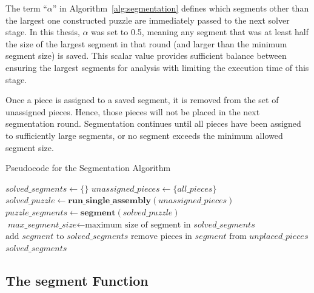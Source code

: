 The term ``\textit{$\alpha$}'' in Algorithm~\ref{alg:segmentation} defines which segments other than the largest one constructed puzzle are immediately passed to the next solver stage.  In this thesis, \textit{$\alpha$} was set to 0.5, meaning any segment that was at least half the size of the largest segment in that round (and larger than the minimum segment size) is saved.  This scalar value provides sufficient balance between ensuring the largest segments for analysis with limiting the execution time of this stage.

Once a piece is assigned to a saved segment, it is removed from the set of unassigned pieces.  Hence, those pieces will not be placed in the next segmentation round.  Segmentation continues until all pieces have been assigned to sufficiently large segments, or no segment exceeds the minimum allowed segment size.

\begin{algorithm}
\caption{Pseudocode for the Segmentation Algorithm}\label{alg:segmentation}
\begin{algorithmic}[1]
    \State $\textit{solved\_segments} \gets \{ \}$
    \State $\textit{unassigned\_pieces} \gets \{ \textit{all\_pieces} \}$
    \Repeat
        \State $\textit{solved\_puzzle} \gets \textbf{run\_single\_assembly}(\textit{unassigned\_pieces})$
        \State $\textit{puzzle\_segments} \gets \textbf{segment}(\textit{solved\_puzzle})$
        \State $\textit{max\_segment\_size} \gets \text{maximum size of segment in } \textit{solved\_segments}$
                \State $\text{add } \textit{segment} \text{ to } \textit{solved\_segments}$
                \State $\text{remove pieces in } \textit{segment} \text{ from } \textit{unplaced\_pieces}$
            \EndIf
        \EndFor
    \State \Return $\textit{solved\_segments}$
\EndFunction
\end{algorithmic}
\end{algorithm}

\subsection{The segment Function}\label{sec:segmentPuzzle}

